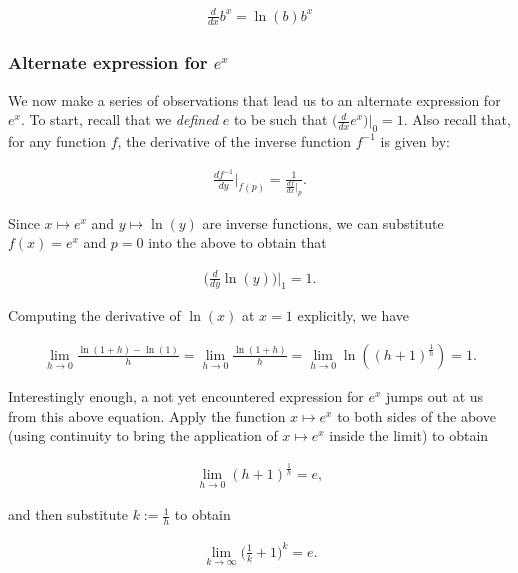 \documentclass{article}
\begin{document}
\begin{align*}
    \boxed
    {
        \frac{d}{dx} b^x = \ln(b) b^x
    }
\end{align*}

\subsubsection*{Alternate expression for $e^x$}

We now make a series of observations that lead us to an alternate expression for $e^x$. To start, recall that we \textit{defined} $e$ to be such that $\Big( \frac{d}{dx} e^x \Big)\Big|_0 = 1$. Also recall that, for any function $f$, the derivative of the inverse function $f^{-1}$ is given by:

\begin{align*}
    \frac{df^{-1}}{dy}\Big|_{f(p)} = \frac{1}{\frac{df}{dx}\Big|_p}.
\end{align*}

Since $x \mapsto e^x$ and $y \mapsto \ln(y)$ are inverse functions, we can substitute $f(x) = e^x$ and $p = 0$ into the above to obtain that

\begin{align*}
    \Big( \frac{d}{dy} \ln(y) \Big)\Big|_1 = 1.
\end{align*}

Computing the derivative of $\ln(x)$ at $x = 1$ explicitly, we have

\begin{align*}
    \lim_{h \rightarrow 0} \frac{\ln(1 + h) - \ln(1)}{h} = \lim_{h \rightarrow 0} \frac{\ln(1 + h)}{h} = \lim_{h \rightarrow 0} \ln((h + 1)^\frac{1}{h}) = 1.
\end{align*}

Interestingly enough, a not yet encountered expression for $e^x$ jumps out at us from this above equation. Apply the function $x \mapsto e^x$ to both sides of the above (using continuity to bring the application of $x \mapsto e^x$ inside the limit) to obtain

\begin{align*}
    \lim_{h \rightarrow 0} (h + 1)^{\frac{1}{h}} = e,
\end{align*}

and then substitute $k := \frac{1}{h}$ to obtain

\begin{align*}
   \lim_{k \rightarrow \infty} \Big( \frac{1}{k} + 1 \Big)^k = e.
\end{align*}
\end{document}
